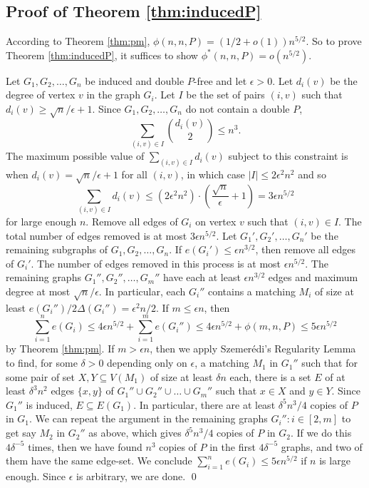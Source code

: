 \documentclass[12pt]{article}
\begin{document}
\subsection{Proof of Theorem \ref{thm:inducedP}}

According to Theorem \ref{thm:pm}, $\phi(n,n,P) = (1/2 + o(1))n^{5/2}$. So to prove Theorem \ref{thm:inducedP}, it suffices to show $\phi^*(n,n,P) = o(n^{5/2})$. 

Let $G_1, G_2, \dots, G_n$ be induced and double $P$-free and let $\epsilon > 0$. Let $d_i(v)$ be the degree of vertex $v$ in the graph $G_i$. Let $I$ be the set of pairs $(i,v)$ such that $d_i(v) \geq \sqrt{n}/\epsilon + 1$. Since $G_1, G_2 ,\dots, G_n$ do not contain a double $P$, 
\[ 
  \sum_{(i,v) \in I} {d_i(v) \choose 2} \leq n^3.
\]
The maximum possible value of $\sum_{(i,v) \in I} d_i(v)$ subject to this constraint is when $d_i(v) = \sqrt{n}/\epsilon + 1$ for all $(i,v)$, in which case $|I| \leq 2\epsilon^2n^2$ and so
\[ 
  \sum_{(i,v) \in I} d_i(v) \leq (2\epsilon^2 n^2) \cdot \left(\frac{\sqrt{n}}{\epsilon} + 1\right) = 3\epsilon n^{5/2}
\]
for large enough $n$. Remove all edges of $G_i$ on vertex $v$ such that $(i,v) \in I$. The total number of edges removed is at most $3\epsilon n^{5/2}$. Let $G_1', G_2', \dots, G_n'$ be the remaining subgraphs of $G_1, G_2, \dots, G_n$. If $e(G_i') \leq \epsilon n^{3/2}$, then remove all edges of $G_i'$. The number of edges removed in this process is at most $\epsilon n^{5/2}$. The remaining graphs $G_1'', G_2'', \dots, G_m''$ have each at least $\epsilon n^{3/2}$ edges and maximum degree at most $\sqrt{n}/\epsilon$. In particular, each $G_i''$ contains a matching $M_i$ of size at least $e(G_i'')/2\Delta(G_i'') = \epsilon^2 n/2$. If $m \leq \epsilon n$, then 
\[ 
  \sum_{i = 1}^n e(G_i) \leq 4\epsilon n^{5/2} + \sum_{i = 1}^m e(G_i'') \leq 4\epsilon n^{5/2} + \phi(m, n, P) \leq 5\epsilon n^{5/2}
\]
by Theorem \ref{thm:pm}. If $m > \epsilon n$, then we apply Szemer\'{e}di's Regularity Lemma to find, for some $\delta > 0$ depending only on $\epsilon$, a matching $M_1$ in $G_1''$ such that for some pair of set $X, Y \subseteq V(M_1)$ of size at least $\delta n$ each, there is a set $E$ of at least $\delta^3 n^2$ edges $\{x, y\}$ of $G_1'' \cup G_2'' \cup \dots \cup G_m''$ such that $x \in X$ and $y \in Y$. Since $G_1''$ is induced, $E \subseteq E(G_1)$. In particular, there are at least $\delta^5 n^3/4$ copies of $P$ in $G_1$. We can repeat the argument in the remaining graphs $G_i'' : i \in [2,m]$ to get say $M_2$ in $G_2''$ as above, which gives $\delta^5 n^3/4$ copies of $P$ in $G_2$. If we do this $4\delta^{-5}$ times, then we have found $n^3$ copies of $P$ in the first $4\delta^{-5}$ graphs, and two of them have the same edge-set. We conclude $\sum_{i = 1}^n e(G_i) \leq 5\epsilon n^{5/2}$ if $n$ is large enough. Since $\epsilon$ is arbitrary, we are done. \qed
\end{document}

